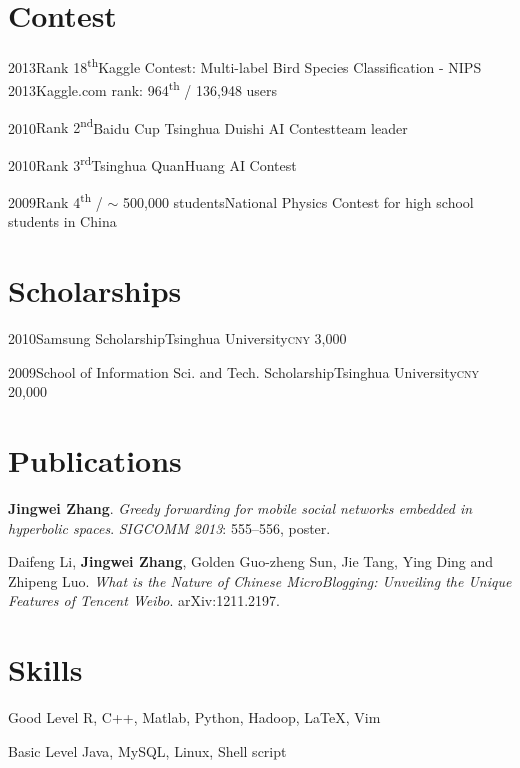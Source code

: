\documentclass{tccv}
\begin{document}

\section{Contest}

\begin{yearlist}

\item{2013}{Rank 18\textsuperscript{th}}{Kaggle Contest: Multi-label Bird Species Classification - NIPS 2013}{Kaggle.com rank: 964\textsuperscript{th} / 136,948 users}{}

\item{2010}{Rank 2\textsuperscript{nd}}{Baidu Cup Tsinghua Duishi AI Contest}{}{team leader}

\item{2010}{Rank 3\textsuperscript{rd}}{Tsinghua QuanHuang AI Contest}{}{}

\item{2009}{Rank 4\textsuperscript{th} / $\sim$ 500,000 students}{National Physics Contest for high school students in China}{}{}



\end{yearlist}

\section{Scholarships}

\begin{yearlist}

\item{2010}{Samsung Scholarship}{Tsinghua University}{}{\textsc{cny} 3,000}
\item{2009}{School of Information Sci. and Tech. Scholarship}{Tsinghua University}{}{\textsc{cny} 20,000}


\end{yearlist}

\section{Publications}

\textbf{Jingwei Zhang}.
\emph{Greedy forwarding for mobile social networks embedded in hyperbolic spaces}.
\emph{SIGCOMM 2013}: 555--556, poster.\medskip

Daifeng Li, \textbf{Jingwei Zhang}, Golden Guo-zheng Sun, Jie Tang, Ying
Ding and Zhipeng Luo.
\emph{What is the Nature of Chinese MicroBlogging: Unveiling the Unique Features of Tencent Weibo}.
arXiv:1211.2197.\medskip

\section{Skills}

\begin{factlist}

\item{Good Level}
      {R, C++, Matlab, Python, Hadoop, \LaTeX, Vim}

\item{Basic Level}
      {Java, MySQL, Linux, Shell script}

\end{factlist}
\end{document}
